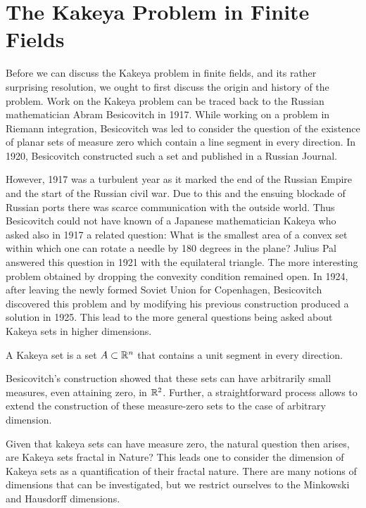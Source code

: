 \chapter{The Kakeya Problem in Finite Fields \label{chap:kakeya}}
Before we can discuss the Kakeya problem in finite fields, and its rather surprising resolution, we ought to first discuss the origin and history of the problem. 
Work on the Kakeya problem can be traced back to the Russian mathematician Abram Besicovitch in 1917. While working on a problem in Riemann integration, Besicovitch was led to consider the question of the existence of planar sets of measure zero which contain a line segment in every direction. In 1920, Besicovitch constructed such a set and published in a Russian Journal.

However, 1917 was a turbulent year as it marked the end of
the Russian Empire and the start of the Russian civil war. Due to this and the ensuing blockade of Russian ports there was scarce communication with the outside world.
Thus Besicovitch could not have known of a Japanese mathematician Kakeya who asked also in 1917 a related question: What is the smallest area of a convex set within which
one can rotate a needle by 180 degrees in the plane? Julius Pal answered this question in 1921 with the equilateral triangle.\cite{pal1920elementares} The 
more interesting problem obtained by dropping the convexity condition remained open. In 1924, after leaving the newly formed Soviet Union for Copenhagen, Besicovitch discovered this
problem and by modifying his previous construction produced a solution in 1925. This lead to the more general questions being asked about Kakeya sets in higher dimensions.
\begin{definition}
    A Kakeya set is a set $A \subset \mathbb R^n$ that contains a unit segment in every direction.
\end{definition}
Besicovitch's construction showed that these sets can have arbitrarily small measures, even attaining zero, in $\mathbb R^2$. Further, a straightforward process allows to extend the construction of these measure-zero sets to the case of arbitrary dimension.

Given that kakeya sets can have measure zero, the natural question then arises, are Kakeya sets fractal in Nature? This leads one to consider the dimension of Kakeya sets as a quantification of their fractal nature. There are many notions of dimensions that can be investigated, but we restrict ourselves to the Minkowski and Hausdorff dimensions.

